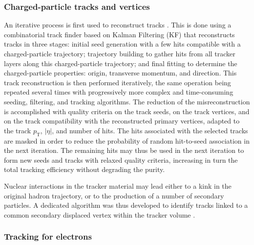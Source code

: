 \subsubsection{Charged-particle tracks and vertices}
An iterative process is first used to reconstruct tracks \cite{tracker}. This is done using a combinatorial track finder based on Kalman Filtering (KF) that reconstructs tracks in three stages:  initial seed generation with a few hits compatible with a charged-particle trajectory; trajectory building to gather hits from all tracker layers along this charged-particle trajectory; and final fitting to determine the charged-particle properties: origin, transverse momentum, and direction. This track reconstruction is then performed iteratively, the same operation being repeated several times with progressively more complex and time-consuming seeding, filtering, and tracking algorithms. The reduction of the misreconstruction is accomplished with quality criteria on the track seeds, on the track vertices, and on the track compatibility with the reconstructed primary vertices, adapted to the track $p_{\mathrm{T}}$, $|\eta|$, and number of hits. The hits associated with the selected tracks are masked in order to reduce the probability of random hit-to-seed association in the next iteration. The remaining hits may thus be used in the next iteration to form new seeds and tracks with relaxed quality criteria, increasing in turn the total tracking efficiency without degrading the purity.

Nuclear interactions in the tracker material may lead either to a kink in the original hadron trajectory, or to the production of a number of secondary particles. A dedicated algorithm was thus developed to identify tracks linked to a common secondary displaced vertex within the tracker volume \cite{CMS-PAS-TRK-10-003,Khachatryan2010}.

\subsubsection{Tracking for electrons}

